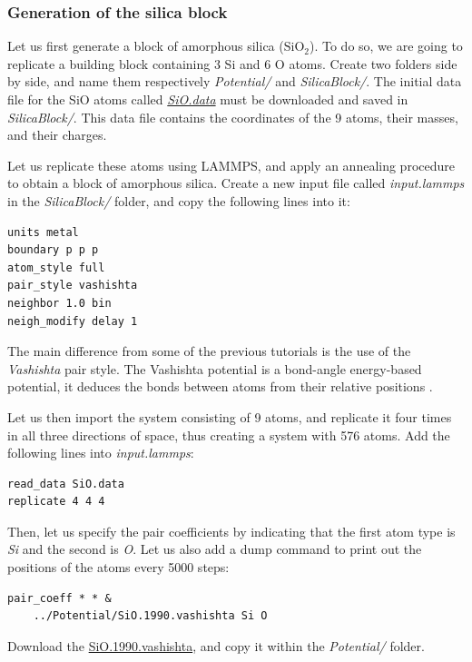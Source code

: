 \documentclass[9pt,tutorial]{livecoms}
\begin{document}
\subsubsection{Generation of the silica block}
\noindent Let us first generate a block of amorphous silica ($\text{SiO}_2$). To do so, we are going to replicate a building block containing 3 Si and 6 O atoms. Create two folders side by side, and name them respectively \textit{Potential/}
and \textit{SilicaBlock/}. The initial data file for the SiO atoms called \href{https://raw.githubusercontent.com/lammpstutorials/lammpstutorials-article/main/files/tutorial6/SiO.data}{\textit{SiO.data}} must be downloaded and saved in \textit{SilicaBlock/}. This data file contains the coordinates of the 9 atoms, their masses, and their charges.

Let us replicate these atoms using LAMMPS, and apply an annealing procedure to obtain a block of amorphous silica. Create a new input file called \textit{input.lammps} in the \textit{SilicaBlock/} folder, and copy
the following lines into it:
{\normalsize \begin{verbatim}
units metal
boundary p p p
atom_style full
pair_style vashishta
neighbor 1.0 bin
neigh_modify delay 1
\end{verbatim}}
The main difference from some of the previous tutorials is the use of the \textit{Vashishta} pair style. The Vashishta potential is a bond-angle energy-based potential, it deduces the bonds between atoms from their relative positions \cite{vashishta1990interaction}.

Let us then import the system consisting of 9 atoms, and replicate it four times in all three directions of space, thus creating a system with 576 atoms. Add the following lines into \textit{input.lammps}:
{\normalsize \begin{verbatim}
read_data SiO.data
replicate 4 4 4
\end{verbatim}}
Then, let us specify the pair coefficients by indicating that the first atom type is \textit{Si} and the second is \textit{O}. Let us also add a dump command to print out the positions of the atoms every 5000 steps:
{\normalsize \begin{verbatim}
pair_coeff * * &
    ../Potential/SiO.1990.vashishta Si O
\end{verbatim}}
Download the \href{https://raw.githubusercontent.com/lammpstutorials/lammpstutorials-article/main/files/tutorial6/SiO.1990.vashishta}{SiO.1990.vashishta}, and copy it within the \textit{Potential/} folder.
\end{document}
